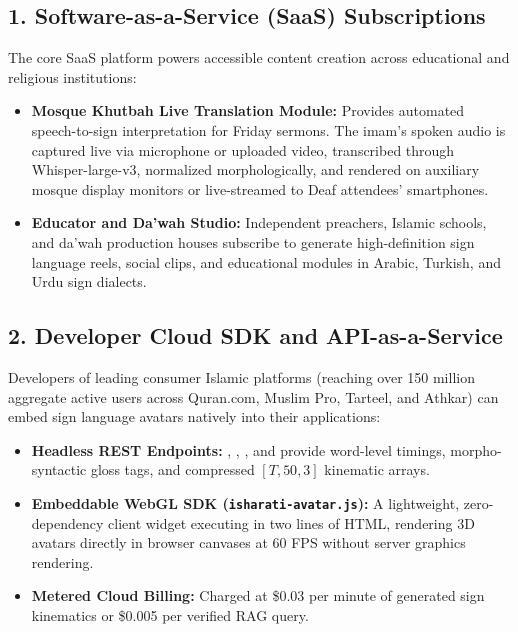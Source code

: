 \subsection{1. Software-as-a-Service (SaaS) Subscriptions}
The core SaaS platform powers accessible content creation across educational and religious institutions:
\begin{itemize}[leftmargin=*,itemsep=2pt]
  \item \textbf{Mosque Khutbah Live Translation Module:} Provides automated speech-to-sign interpretation for Friday sermons. The imam's spoken audio is captured live via microphone or uploaded video, transcribed through Whisper-large-v3, normalized morphologically, and rendered on auxiliary mosque display monitors or live-streamed to Deaf attendees' smartphones.
  \item \textbf{Educator and Da'wah Studio:} Independent preachers, Islamic schools, and da'wah production houses subscribe to generate high-definition sign language reels, social clips, and educational modules in Arabic, Turkish, and Urdu sign dialects.
\end{itemize}

\subsection{2. Developer Cloud SDK and API-as-a-Service}
Developers of leading consumer Islamic platforms (reaching over 150 million aggregate active users across Quran.com, Muslim Pro, Tarteel, and Athkar) can embed sign language avatars natively into their applications:
\begin{itemize}[leftmargin=*,itemsep=2pt]
  \item \textbf{Headless REST Endpoints:} , , , and  provide word-level timings, morpho-syntactic gloss tags, and compressed $[T, 50, 3]$ kinematic arrays.
  \item \textbf{Embeddable WebGL SDK (\texttt{isharati-avatar.js}):} A lightweight, zero-dependency client widget executing in two lines of HTML, rendering 3D avatars directly in browser canvases at 60 FPS without server graphics rendering.
  \item \textbf{Metered Cloud Billing:} Charged at \$0.03 per minute of generated sign kinematics or \$0.005 per verified RAG query.
\end{itemize}

